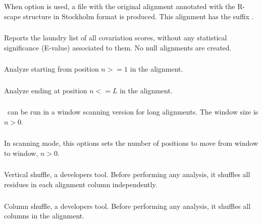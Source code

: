When option  is used, a file with the original alignment  annotated with the R-scape structure in Stockholm format is produced.
This alignment has the suffix .

\subsubsection{} Reports the laundry list of all covariation scores, without any statistical significance (E-value)
associated to them. No null alignments are created.

\subsubsection{} Analyze starting from position $n >= 1$ in the alignment.

\subsubsection{} Analyze ending at position $n <= L$ in the alignment.

\subsubsection{} \rscape\ can be run in a window scanning version for long alignments.
The window size is $n>0$.

\subsubsection{} In scanning mode, this options sets the number of positions to move from window to window, $n >0$.

\subsubsection{} Vertical shuffle, a developers tool. Before performing any analysis, it shuffles all residues in each alignment column independently.

\subsubsection{} Column shuffle, a developers tool. Before performing any analysis, it shuffles all columns in the alignment.



